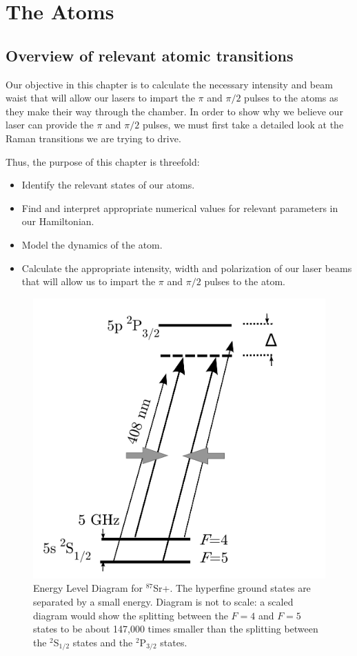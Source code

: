 \chapter{The Atoms} \label{ChapterAboutTheAtoms}
\section{Overview of relevant atomic transitions}

Our objective in this chapter is to calculate the necessary intensity and beam waist that will allow our lasers to impart the $\pi$ and $\pi/2$ pulses to the atoms as they make their way through the chamber. In order to show why we believe our laser can provide the $\pi$ and $\pi/2$ pulses, we must first take a detailed look at the Raman transitions we are trying to drive. 

Thus, the purpose of this chapter is threefold:
\begin{itemize}
\item Identify the relevant states of our atoms.
\item Find and interpret appropriate numerical values for relevant parameters in our Hamiltonian.
\item Model the dynamics of the atom.
\item Calculate the appropriate intensity, width and polarization of our laser beams that will allow us to impart the $\pi$ and $\pi/2$ pulses to the atom. 
\end{itemize}

\begin{figure}
\centerline{
\includegraphics[totalheight=0.3\textheight]{E_level_from_proposal}
}
\caption[Energy Level Diagram for $^{87}$Sr+]{Energy Level Diagram for $^{87}$Sr+. The hyperfine ground states are separated by a small energy. Diagram is not to scale: a scaled diagram would show the splitting between the $F=4$ and $F=5$ states to be about 147,000 times smaller than the splitting between the $^2$S$_{1/2}$ states and the $^2$P$_{3/2}$ states.}
\end{figure}

